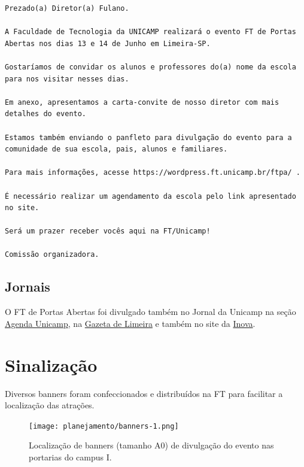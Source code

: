 \documentclass[
  letterpaper,
  DIV=11,
  numbers=noendperiod]{scrreprt}
\begin{document}
\begin{verbatim}
Prezado(a) Diretor(a) Fulano.

A Faculdade de Tecnologia da UNICAMP realizará o evento FT de Portas Abertas nos dias 13 e 14 de Junho em Limeira-SP.

Gostaríamos de convidar os alunos e professores do(a) nome da escola para nos visitar nesses dias.

Em anexo, apresentamos a carta-convite de nosso diretor com mais detalhes do evento.

Estamos também enviando o panfleto para divulgação do evento para a comunidade de sua escola, pais, alunos e familiares.

Para mais informações, acesse https://wordpress.ft.unicamp.br/ftpa/ .

É necessário realizar um agendamento da escola pelo link apresentado no site.

Será um prazer receber vocês aqui na FT/Unicamp! 

Comissão organizadora.
\end{verbatim}

\subsection{Jornais}\label{jornais}

O FT de Portas Abertas foi divulgado também no Jornal da Unicamp na
seção
\href{https://jornal.unicamp.br/agenda/2025/05/06/faculdade-de-tecnologia-realiza-a-edicao-2025-do-evento-ft-de-portas-abertas/\#:~:text=Nos\%20dias\%2013\%20e\%2014\%20de\%20junho\%20de\%202025\%2C\%20a,e\%20tecnol\%C3\%B3gica\%20oferecidas\%20pela\%20institui\%C3\%A7\%C3\%A3o.}{Agenda
Unicamp}, na \href{https://instagram.com/p/DJZ7ulQBLoF/}{Gazeta de
Limeira} e também no site da
\href{https://www.inova.unicamp.br/2025/05/inova-unicamp-estara-no-ft-de-portas-abertas-em-limeira/}{Inova}.

\section{Sinalização}\label{sinalizauxe7uxe3o}

Diversos banners foram confeccionados e distribuídos na FT para
facilitar a localização das atrações.

\begin{figure}[H]

{\centering \texttt{[image: planejamento/banners-1.png]}

}

\caption{Localização de banners (tamanho A0) de divulgação do evento nas
portarias do campus I.}

\end{figure}%
\end{document}

